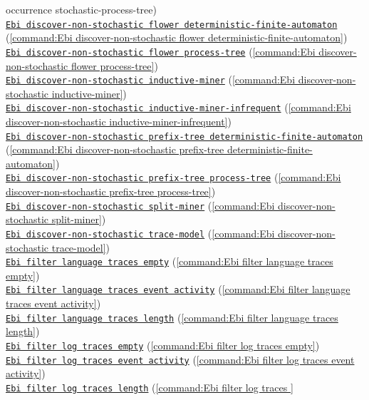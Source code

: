 {occurrence stochastic-process-tree})\\\null\qquad\hyperref[command:Ebi discover-non-stochastic flower deterministic-finite-automaton]{\texttt{Ebi discover-non-stochastic flower deterministic-finite-automaton}} (\cref{command:Ebi discover-non-stochastic flower deterministic-finite-automaton})\\\null\qquad\hyperref[command:Ebi discover-non-stochastic flower process-tree]{\texttt{Ebi discover-non-stochastic flower process-tree}} (\cref{command:Ebi discover-non-stochastic flower process-tree})\\\null\qquad\hyperref[command:Ebi discover-non-stochastic inductive-miner]{\texttt{Ebi discover-non-stochastic inductive-miner}} (\cref{command:Ebi discover-non-stochastic inductive-miner})\\\null\qquad\hyperref[command:Ebi discover-non-stochastic inductive-miner-infrequent]{\texttt{Ebi discover-non-stochastic inductive-miner-infrequent}} (\cref{command:Ebi discover-non-stochastic inductive-miner-infrequent})\\\null\qquad\hyperref[command:Ebi discover-non-stochastic prefix-tree deterministic-finite-automaton]{\texttt{Ebi discover-non-stochastic prefix-tree deterministic-finite-automaton}} (\cref{command:Ebi discover-non-stochastic prefix-tree deterministic-finite-automaton})\\\null\qquad\hyperref[command:Ebi discover-non-stochastic prefix-tree process-tree]{\texttt{Ebi discover-non-stochastic prefix-tree process-tree}} (\cref{command:Ebi discover-non-stochastic prefix-tree process-tree})\\\null\qquad\hyperref[command:Ebi discover-non-stochastic split-miner]{\texttt{Ebi discover-non-stochastic split-miner}} (\cref{command:Ebi discover-non-stochastic split-miner})\\\null\qquad\hyperref[command:Ebi discover-non-stochastic trace-model]{\texttt{Ebi discover-non-stochastic trace-model}} (\cref{command:Ebi discover-non-stochastic trace-model})\\\null\qquad\hyperref[command:Ebi filter language traces empty]{\texttt{Ebi filter language traces empty}} (\cref{command:Ebi filter language traces empty})\\\null\qquad\hyperref[command:Ebi filter language traces event activity]{\texttt{Ebi filter language traces event activity}} (\cref{command:Ebi filter language traces event activity})\\\null\qquad\hyperref[command:Ebi filter language traces length]{\texttt{Ebi filter language traces length}} (\cref{command:Ebi filter language traces length})\\\null\qquad\hyperref[command:Ebi filter log traces empty]{\texttt{Ebi filter log traces empty}} (\cref{command:Ebi filter log traces empty})\\\null\qquad\hyperref[command:Ebi filter log traces event activity]{\texttt{Ebi filter log traces event activity}} (\cref{command:Ebi filter log traces event activity})\\\null\qquad\hyperref[command:Ebi filter log traces length]{\texttt{Ebi filter log traces length}} (\cref{command:Ebi filter log traces }
